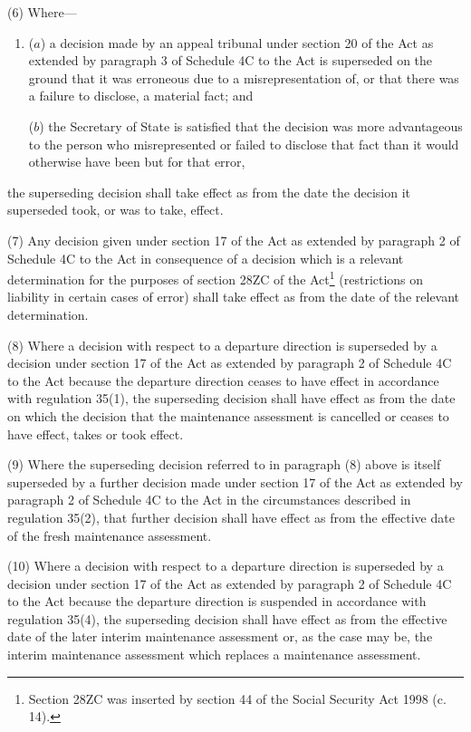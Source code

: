 \documentclass[12pt,a4paper]{article}
\begin{document}
(6) Where---
\begin{enumerate}\item[]
($a$) a decision made by an appeal tribunal under section 20 of the Act as extended by paragraph 3 of Schedule 4C to the Act is superseded on the ground that it was erroneous due to a misrepresentation of, or that there was a failure to disclose, a material fact; and

($b$) the Secretary of State is satisfied that the decision was more advantageous to the person who misrepresented or failed to disclose that fact than it would otherwise have been but for that error,
\end{enumerate}
the superseding decision shall take effect as from the date the decision it superseded took, or was to take, effect.

(7) Any decision given under section 17 of the Act as extended by paragraph 2 of Schedule 4C to the Act in consequence of a decision which is a relevant determination for the purposes of section 28ZC of the Act\footnote{\frenchspacing Section 28ZC was inserted by section 44 of the Social Security Act 1998 (c. 14).} (restrictions on liability in certain cases of error) shall take effect as from the date of the relevant determination.

(8) Where a decision with respect to a departure direction is superseded by a decision under section 17 of the Act as extended by paragraph 2 of Schedule 4C to the Act because the departure direction ceases to have effect in accordance with regulation 35(1), the superseding decision shall have effect as from the date on which the decision that the maintenance assessment is cancelled or ceases to have effect, takes or took effect.

(9) Where the superseding decision referred to in paragraph (8) above is itself superseded by a further decision made under section 17 of the Act as extended by paragraph 2 of Schedule 4C to the Act in the circumstances described in regulation 35(2), that further decision shall have effect as from the effective date of the fresh maintenance assessment.

(10) Where a decision with respect to a departure direction is superseded by a decision under section 17 of the Act as extended by paragraph 2 of Schedule 4C to the Act because the departure direction is suspended in accordance with regulation 35(4), the superseding decision shall have effect as from the effective date of the later interim maintenance assessment or, as the case may be, the interim maintenance assessment which replaces a maintenance assessment.
\end{document}

